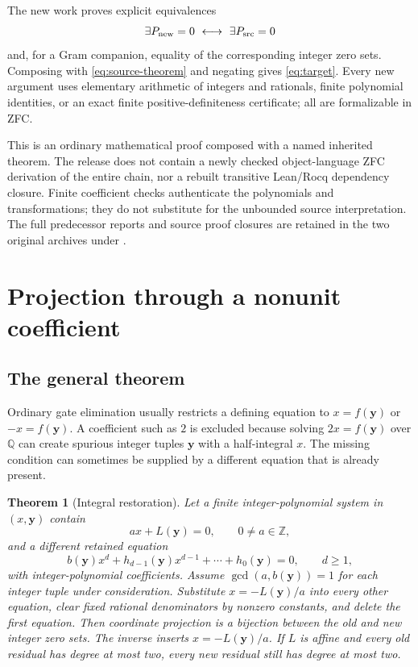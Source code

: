 \documentclass[11pt]{article}
\newtheorem{theorem}{Theorem}[section]
\theoremstyle{remark}\newtheorem{remark}[theorem]{Remark}
\newcommand{\Z}{\mathbb Z}
\newcommand{\Q}{\mathbb Q}
\newcommand{\code}[1]{\texttt{\detokenize{#1}}}
\begin{document}
The new work proves explicit equivalences
\[
\exists P_{\rm new}=0\ \longleftrightarrow\ \exists P_{\rm src}=0
\]
and, for a Gram companion, equality of the corresponding integer zero
sets. Composing with \eqref{eq:source-theorem} and negating gives
\eqref{eq:target}. Every new argument uses elementary arithmetic of
integers and rationals, finite polynomial identities, or an exact finite
positive-definiteness certificate; all are formalizable in ZFC.

This is an ordinary mathematical proof composed with a named inherited
theorem. The release does not contain a newly checked object-language
ZFC derivation of the entire chain, nor a rebuilt transitive Lean/Rocq
dependency closure. Finite coefficient checks authenticate the
polynomials and transformations; they do not substitute for the
unbounded source interpretation. The full predecessor reports and source
proof closures are retained in the two original archives under
\code{sources/}.

\section{Projection through a nonunit coefficient}\label{sec:projection}

\subsection{The general theorem}

Ordinary gate elimination usually restricts a defining equation to
$x=f(\boldsymbol y)$ or $-x=f(\boldsymbol y)$. A coefficient such as $2$
is excluded because solving $2x=f(\boldsymbol y)$ over $\Q$ can create
spurious integer tuples $\boldsymbol y$ with a half-integral $x$.
The missing condition can sometimes be supplied by a different equation
that is already present.

\begin{theorem}[Integral restoration]\label{thm:projection}
Let a finite integer-polynomial system in $(x,\boldsymbol y)$ contain
\[
a x+L(\boldsymbol y)=0,\qquad 0\ne a\in\Z,
\]
and a different retained equation
\[
b(\boldsymbol y)x^d+
h_{d-1}(\boldsymbol y)x^{d-1}+\cdots+h_0(\boldsymbol y)=0,
\qquad d\ge1,
\]
with integer-polynomial coefficients. Assume
$\gcd(a,b(\boldsymbol y))=1$ for each integer tuple under consideration.
Substitute $x=-L(\boldsymbol y)/a$ into every other equation, clear fixed
rational denominators by nonzero constants, and delete the first equation.
Then coordinate projection is a bijection between the old and new
integer zero sets. The inverse inserts $x=-L(\boldsymbol y)/a$.
If $L$ is affine and every old residual has degree at most two, every new
residual still has degree at most two.
\end{theorem}
\end{document}
